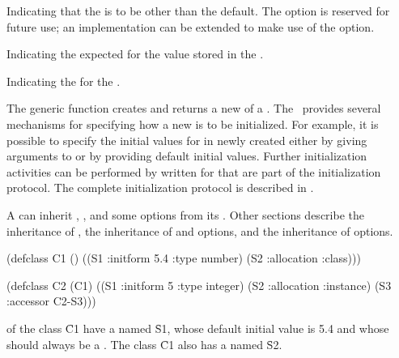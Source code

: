 \itemitem{\bull} Indicating that the  is to be other 
than the default.  The  option is reserved for future use; 
an implementation can be extended to make use of the 
option.

\itemitem{\bull} Indicating the expected  for the value stored
in the .

\itemitem{\bull} Indicating the  for the .

\endlist 

\endsubSection%

\goodbreak

                      
The generic function  creates and returns a new
 of a .  
The \OS\ provides several mechanisms for
specifying how a new  is to be initialized.  For example, it
is possible to specify the initial values for  in newly created
either by giving arguments to  or by
providing default initial values.  Further initialization activities
can be performed by  written for  
that are
part of the initialization protocol.  The complete initialization
protocol is described in \secref\ObjectCreationAndInit.

\endsubSection%

                                              
A  can inherit , , 
and some  options from its .  
Other sections describe the inheritance of , 
the inheritance of  and  options, 
and the inheritance of  options.
 


\code
 (defclass C1 () 
     ((S1 :initform 5.4 :type number) 
      (S2 :allocation :class)))
 
 (defclass C2 (C1) 
     ((S1 :initform 5 :type integer)
      (S2 :allocation :instance)
      (S3 :accessor C2-S3)))
\endcode

 of the class \f{C1} have a  named \f{S1},
whose default initial value is 5.4 and
whose  should always be a .
The class \f{C1} also has a  named \f{S2}.

